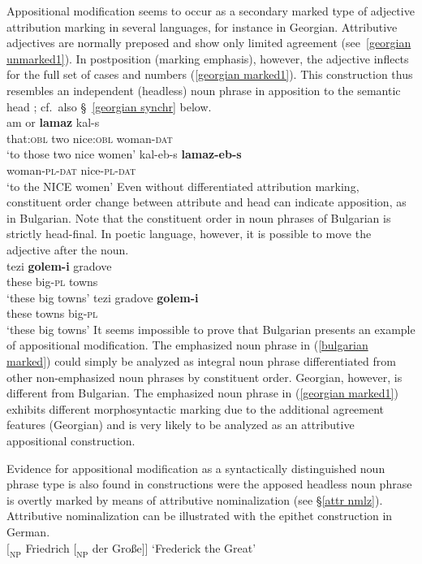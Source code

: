 Appositional modification seems to occur as a secondary marked type of adjective attribution marking in several languages, for instance in Georgian. Attributive adjectives are normally preposed and show only limited agreement (see~\ref{georgian unmarked1}). In postposition (marking emphasis), however, the adjective inflects for the full set of cases and numbers (\ref{georgian marked1}). This construction thus resembles an independent (headless) noun phrase in apposition to the semantic head \citep[652, 677]{testelec1998}; cf.~also \S~\ref{georgian synchr} below.
\ea
{}\\
\ea \label{georgian unmarked1}
\gll	am or \textbf{lamaz} kal-s\\
	that:\textsc{obl} two nice:\textsc{obl} woman-\textsc{dat}\\
\glt	‘to those two nice women’
\ex \label{georgian marked1}
\gll	kal-eb-s \textbf{lamaz-eb-s}\\
	woman-\textsc{pl}-\textsc{dat} nice-\textsc{pl}-\textsc{dat}\\
\glt	‘to the NICE women’
\z
\z
Even without differentiated attribution marking, constituent order change between attribute and head can indicate apposition, as in Bulgarian. Note that the constituent order in noun phrases of Bulgarian is strictly head-final. In poetic language, however, it is possible to move the adjective after the noun.
\ea
{}\\
\ea
\gll	tezi \textbf{golem-i} gradove\\
	these big-\textsc{pl} towns\\
\glt	‘these big towns’
\ex	\label{bulgarian marked}
\gll	tezi gradove \textbf{golem-i}\\
	these towns big-\textsc{pl}\\
\glt	‘these big towns’
\z
\z
It seems impossible to prove that Bulgarian presents an example of appositional modification. The emphasized noun phrase in (\ref{bulgarian marked}) could simply be analyzed as integral noun phrase differentiated from other non-emphasized noun phrases by constituent order. Georgian, however, is different from Bulgarian. The emphasized noun phrase in (\ref{georgian marked1}) exhibits different morphosyntactic marking due to the additional agreement features (Georgian) and is very likely to be analyzed as an attributive appositional construction.

Evidence for appositional modification as a syntactically distinguished noun phrase type is also found in constructions were the apposed headless noun phrase is overtly marked by means of attributive nominalization (see \S \ref{attr nmlz}). Attributive nominalization can be illustrated with the epithet construction in German.
\ea 
{}\\
$[_\textrm{NP}$ Friedrich $[_\textrm{NP}$ der Gro{ß}e$] ]$ \textrm{‘Frederick the Great’}
\z
{}